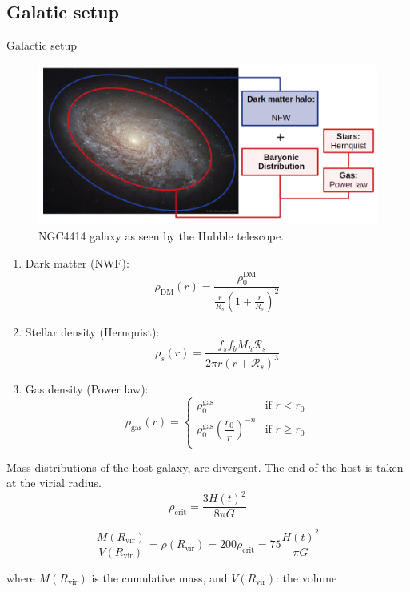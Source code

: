 \documentclass{beamer}
\begin{document}
\subsection{Galatic setup}
\begin{frame}{Galactic setup}
	\begin{figure}[h]
		\centering
		\includegraphics[width=0.8\linewidth]{../Documento/Figures/NGC4414_modified}
		\caption{NGC4414 galaxy as seen by the Hubble telescope.}
	\end{figure}
\end{frame}

\begin{frame}
	\begin{enumerate}
		\item Dark matter (NWF):
		\begin{equation}\label{eq: dmdensity}
		\rho_\text{DM}(r) = \dfrac{\rho_0^\text{DM}}{\frac{r}{R_s}\left(1 + \frac{r}{R_s}\right)^2}
		\end{equation}
		\item Stellar density (Hernquist):
		\begin{equation}
		\rho_s(r) = \dfrac{f_sf_bM_h \mathcal{R}_s}{2\pi r(r + \mathcal{R}_s)^3}
		\end{equation}
		\item Gas density (Power law):
		\begin{equation}
		\rho_\text{gas}(r) = \left \{
		\begin{matrix}
		\rho_0^\text{gas} & \text{if $r < r_0$}\\
		\rho_0^\text{gas}\left(\dfrac{r_0}{r}\right)^{-n} & \text{if $r \geq r_0$}\\
		\end{matrix}
		\right.
		\end{equation}
	\end{enumerate}
\end{frame}

\begin{frame}
	Mass distributions of the host galaxy, are divergent. The end of the host is taken at the virial radius.
	\begin{equation}\label{eq: critical_density}
	\rho_\text{crit} = \dfrac{3H(t)^2}{8\pi G}
	\end{equation}
	
	\begin{equation}\label{eq: R_vir_def}
	\dfrac{M(R_\text{vir})}{V(R_\text{vir})} = \bar{\rho}(R_\text{vir}) =  200 \rho_\text{crit} = 75\dfrac{H(t)^2}{\pi G}
	\end{equation}
	
	where $M(R_\text{vir})$ is the cumulative mass, and $V(R_\text{vir})$: the volume
\end{frame}
\end{document}

